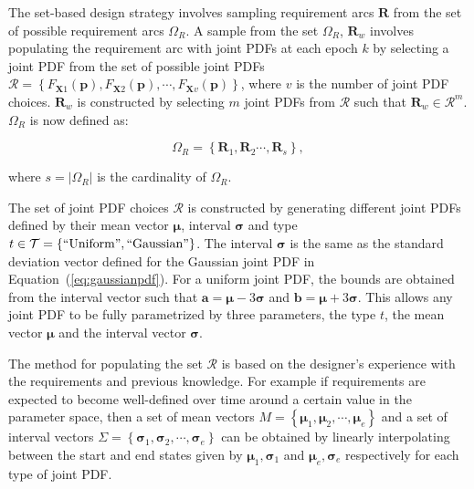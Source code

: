 The set-based design strategy involves sampling requirement arcs $\mathbf{R}$ from the set of possible requirement arcs $\Omega_R$. A sample from the set $\Omega_R$, $\mathbf{R}_w$ involves populating the requirement arc with joint \acp{PDF} at each epoch $k$ by selecting a joint \ac{PDF} from the set of possible joint \acp{PDF} $\mathcal{R} = \left\{F_{\mathbf{X}1}(\mathbf{p}),F_{\mathbf{X}2}(\mathbf{p}),\cdots,F_{\mathbf{X}v}(\mathbf{p})\right\}$, where $v$ is the number of joint \ac{PDF} choices. $\mathbf{R}_w$ is constructed by selecting $m$ joint \acp{PDF} from $\mathcal{R}$ such that $\mathbf{R}_w \in \mathcal{R}^m$. $\Omega_R$ is now defined as:

\begin{equation} \label{eq:Rarcsample}
	\Omega_R = \left\{\mathbf{R}_1,\mathbf{R}_2\cdots,\mathbf{R}_s\right\},
\end{equation}

where $s = |\Omega_R|$ is the cardinality of $\Omega_R$.

The set of joint \ac{PDF} choices $\mathcal{R}$ is constructed by generating different joint \acp{PDF} defined by their mean vector $\boldsymbol{\mu}$, interval $\boldsymbol{\sigma}$ and type $t\in\mathcal{T} = \left\{\mathrm{``Uniform"},\mathrm{``Gaussian"}\right\}$. The interval $\boldsymbol{\sigma}$ is the same as the standard deviation vector defined for the Gaussian joint \ac{PDF} in Equation~(\ref{eq:gaussianpdf}). For a uniform joint \ac{PDF}, the bounds are obtained from the interval vector such that $\mathbf{a} = \boldsymbol{\mu} - 3\boldsymbol{\sigma}$ and $\mathbf{b} = \boldsymbol{\mu} + 3\boldsymbol{\sigma}$. This allows any joint \ac{PDF} to be fully parametrized by three parameters, the type $t$, the mean vector $\boldsymbol{\mu}$ and the interval vector $\boldsymbol{\sigma}$.

The method for populating the set $\mathcal{R}$ is based on the designer's experience with the requirements and previous knowledge. For example if requirements are expected to become well-defined over time around a certain value in the parameter space, then a set of mean vectors $M = \left\{\boldsymbol{\mu}_1,\boldsymbol{\mu}_2,\cdots,\boldsymbol{\mu}_e\right\}$ and a set of interval vectors $\Sigma = \left\{\boldsymbol{\sigma}_1,\boldsymbol{\sigma}_2,\cdots,\boldsymbol{\sigma}_e\right\}$ can be obtained by linearly interpolating between the start and end states given by $\boldsymbol{\mu}_1,\boldsymbol{\sigma}_1$ and $\boldsymbol{\mu}_e,\boldsymbol{\sigma}_e$ respectively for each type of joint \ac{PDF}. 


